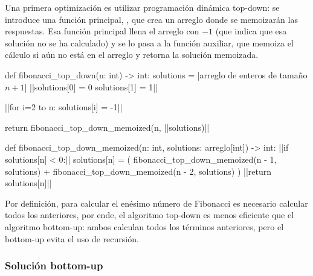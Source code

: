 Una primera optimización es utilizar programación dinámica top-down: se introduce una función principal, , que crea un arreglo donde se memoizarán las respuestas. Esa función principal llena el arreglo con $-1$ (que indica que esa solución no se ha calculado) y se lo pasa a la función auxiliar, que memoiza el cálculo si aún no está en el arreglo y retorna la solución memoizada.
\begin{pseudocode}
def fibonacci_top_down(n: int) -> int:
    solutions = |\textrm{arreglo de enteros de tamaño }$n+1$|
    ||solutions[0] = 0
    solutions[1] = 1||

    ||for i=2 to n:
        solutions[i] = -1||

    return fibonacci_top_down_memoized(n, ||solutions)||

def fibonacci_top_down_memoized(n: int, solutions: arreglo[int]) -> int:
    ||if solutions[n] < 0:||
        solutions[n] = (
            fibonacci_top_down_memoized(n - 1, solutions) + 
            fibonacci_top_down_memoized(n - 2, solutions)
        )
    ||return solutions[n]||
\end{pseudocode}
\begin{annotations}
\end{annotations}

Por definición, para calcular el enésimo número de Fibonacci es necesario calcular todos los anteriores, por ende, el algoritmo top-down es menos eficiente que el algoritmo bottom-up: ambos calculan todos los términos anteriores, pero el bottom-up evita el uso de recursión.

\subsubsection{Solución bottom-up}

